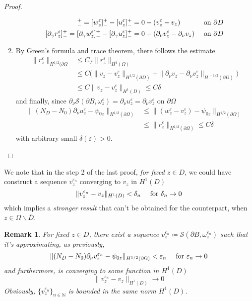 \documentclass[10pt, a4paper, twoside, openright]{book}
\theoremstyle{definition}
\theoremstyle{plain}
\theoremstyle{plain}
\theoremstyle{plain}
\theoremstyle{plain}
\newtheorem{remark}[subsection]{Remark}
\theoremstyle{plain}
\theoremstyle{plain}
\theoremstyle{plain}
\theoremstyle{plain}
\let\epsilon\varepsilon
\begin{document}
\begin{proof}
\begin{enumerate}
  \begin{align}
   [r^\epsilon_z]^+_- = [w^\epsilon_z]^+_- -[u^\epsilon_z]^+_- &=0 - (v^\epsilon_z - v_z) && \textup{ on }\partial D \\
   [\partial_\gamma r^\epsilon_z]^+_- = [\partial_\gamma w^\epsilon_z]^+_- -[\partial_\gamma u^\epsilon_z]^+_-&= 0 - (\partial_\nu v^\epsilon_z - \partial_\nu v_z) && \textup{ on }\partial D 
  \end{align}
  \item By Green's formula and trace theorem, there follows the estimate
  \begin{align}
   \|r^\epsilon_z\|_{H^{1/2}(\partial \Omega} & \leq C_T\|r^\epsilon_z\|_{H^1(\Omega)} \\
   & \leq C\bigl(\|v_z - v^\epsilon_z\|_{H^{1/2}(\partial D)} + \|\partial_\nu v_z - \partial_\nu v^\epsilon_z\|_{H^{\, -1/2}(\partial D)}\bigr) \\
   & \leq C \|v_z - v^\epsilon_z\|_{H^1(D)}\leq C\delta
  \end{align}
  and finally, since $\partial_\nu\mathcal{S}(\partial B, \omega^\epsilon_z) = \partial_\nu u^\epsilon_z = \partial_\nu v^\epsilon_z$ on $\partial \Omega$
  \begin{align}
   \|({N_D} - {N_0})\partial_\nu u^\epsilon_z - \psi_{0z}\|_{H^{1/2}(\partial\Omega)} &\leq \|(w^\epsilon_z- v^\epsilon_z) - \psi_{0z}\|_{H^{1/2}(\partial\Omega)} \\
   &\leq\|r^\epsilon_z\|_{H^{1/2}(\partial \Omega)}\leq C\delta
  \end{align}
  with arbitrary small $\delta(\epsilon)>0$.
 \end{enumerate}
\end{proof}
We note that in the step 2 of the last proof, \emph{for fixed $z \in D$}, we could have construct a sequence $v^{\epsilon_n}_z$ converging to $v_z$ in $H^1(D)$
\begin{equation}
 \|v^{\epsilon_n}_z - v_z\|_{H^1(D)} < \delta_n \quad \textup{ for }\delta_n \to 0
\end{equation}
which implies a \emph{stronger result} that can't be obtained for the counterpart, when $z\in\Omega\backslash\overline{D}$.
\begin{remark}
 For fixed $z\in D$, there exist a sequence $v^{\epsilon_n}_z\coloneqq\mathcal{S}(\partial B, \omega^{\epsilon_n}_z)$ such that it's approximating, as previously,
\begin{equation}
 \|({N_D} - {N_0})\partial_\nu v^{\epsilon_n}_z - \psi_{0z}\|_{H^{1/2}(\partial\Omega)} < \epsilon_n \quad \textup{ for }\epsilon_n\to 0
\end{equation}
 and furthermore, is converging to some function in $H^1(D)$
\begin{equation}
 \|v^{\epsilon_n}_z - v_z\|_{H^1(D)} \to 0
\end{equation}
 Obviously, $\{v^{\epsilon_n}_z\}_{n\in\mathbb{N}}$ is bounded in the same norm $H^1(D)$.
\end{remark}
\end{document}

